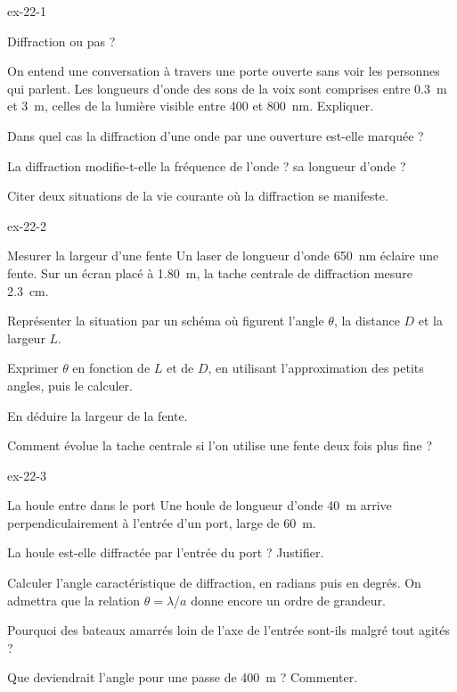 \begin{blocLivre}{ex-22-1}
\begin{exercice}[1]{Diffraction ou pas ?}
\begin{questions}
\item On entend une conversation à travers une porte ouverte sans voir les personnes qui parlent. Les longueurs d'onde
des sons de la voix sont comprises entre \qty{0,3}{m} et \qty{3}{m}, celles de la lumière visible entre 400 et \qty{800}{nm}.
Expliquer.
\item Dans quel cas la diffraction d'une onde par une ouverture est-elle marquée ?
\item La diffraction modifie-t-elle la fréquence de l'onde ? sa longueur d'onde ?
\item Citer deux situations de la vie courante où la diffraction se manifeste.
\end{questions}
\end{exercice}
\end{blocLivre}
\begin{blocLivre}{ex-22-2}
\begin{exercice}[1]{Mesurer la largeur d'une fente}
Un laser de longueur d'onde \qty{650}{nm} éclaire une fente. Sur un écran placé à \qty{1,80}{m}, la tache centrale de
diffraction mesure \qty{2,3}{cm}.
\begin{questions}
\item Représenter la situation par un schéma où figurent l'angle $\theta$, la distance $D$ et la largeur $L$.
\item Exprimer $\theta$ en fonction de $L$ et de $D$, en utilisant l'approximation des petits angles, puis le calculer.
\item En déduire la largeur de la fente.
\item Comment évolue la tache centrale si l'on utilise une fente deux fois plus fine ?
\end{questions}
\end{exercice}
\end{blocLivre}
\begin{blocLivre}{ex-22-3}
\begin{exercice}[1]{La houle entre dans le port}
Une houle de longueur d'onde \qty{40}{m} arrive perpendiculairement à l'entrée d'un port, large de \qty{60}{m}.
\begin{questions}
\item La houle est-elle diffractée par l'entrée du port ? Justifier.
\item Calculer l'angle caractéristique de diffraction, en radians puis en degrés. On admettra que la relation
$\theta=\lambda/a$ donne encore un ordre de grandeur.
\item Pourquoi des bateaux amarrés loin de l'axe de l'entrée sont-ils malgré tout agités ?
\item Que deviendrait l'angle pour une passe de \qty{400}{m} ? Commenter.
\end{questions}
\end{exercice}
\end{blocLivre}
